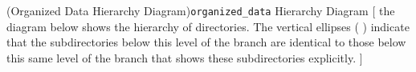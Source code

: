 \Section*(Organized Data Hierarchy Diagram){\texttt{organized\_data} Hierarchy Diagram}%
[%
    \vspace{-2mm}%
    the diagram below shows the hierarchy of  directories.  The vertical ellipses (\,\protect\tinyvdots\,) indicate that the subdirectories below this level of the branch are identical to those below this same level of the branch that shows these subdirectories explicitly.%
]
